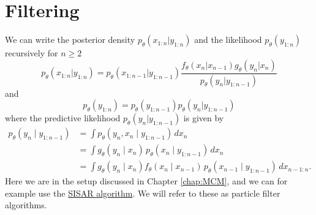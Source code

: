 \section{Filtering}
We can write the posterior density $p_\theta(x_{1:n} \vert y_{1:n})$ and the likelihood $p_\theta(y_{1:n})$ recursively for $n\geq 2$
\begin{equation*}
	p_\theta(x_{1:n} \vert y_{1:n})=p_\theta(x_{1:n-1} \vert y_{1:n-1})\frac{f_\theta(x_n \vert x_{n-1})g_\theta(y_n \vert x_n)}{p_\theta(y_n \vert y_{1:n-1})}
\end{equation*} 
and
\begin{equation*}
	p_\theta(y_{1:n})=p_\theta(y_{1:n-1}) p_\theta(y_n \vert y_{1:n-1})
\end{equation*} 
where the predictive likelihood $p_\theta(y_n \vert y_{1:n-1})$ is given by
\begin{align*}
	p_\theta(y_n \mid y_{1:n-1}) 
	&= \int p_\theta(y_n, x_n \mid y_{1:n-1})\,dx_n  \\
	&= \int g_\theta(y_n \mid x_n)\,p_\theta(x_n \mid y_{1:n-1})\,dx_n  \\
	&= \int g_\theta(y_n \mid x_n) f_\theta(x_n \mid x_{n-1})\,p_\theta(x_{n-1} \mid y_{1:n-1}) \,dx_{n-1:n}. 
\end{align*}
Here we are in the setup discussed in Chapter \ref{chap:MCM}, and we can for example use the \hyperref[algo:SISAR]{SISAR algorithm}. We will refer to these as particle filter algorithms. 
